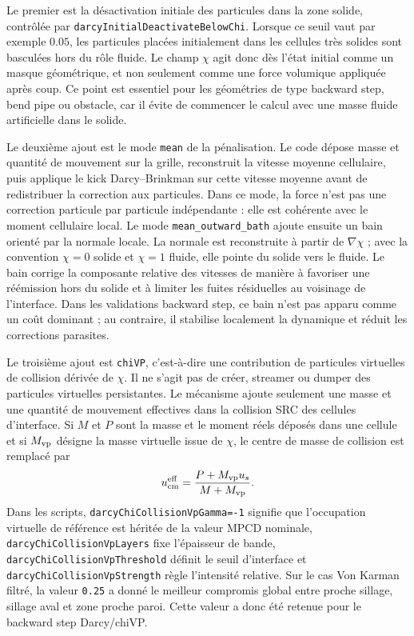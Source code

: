 \documentclass[11pt,a4paper]{article}
\begin{document}
Le premier est la désactivation initiale des particules dans la zone solide, contrôlée par \texttt{darcyInitialDeactivateBelowChi}. Lorsque ce seuil vaut par exemple $0.05$, les particules placées initialement dans les cellules très solides sont basculées hors du rôle fluide. Le champ $\chi$ agit donc dès l'état initial comme un masque géométrique, et non seulement comme une force volumique appliquée après coup. Ce point est essentiel pour les géométries de type backward step, bend pipe ou obstacle, car il évite de commencer le calcul avec une masse fluide artificielle dans le solide.

Le deuxième ajout est le mode \texttt{mean} de la pénalisation. Le code dépose masse et quantité de mouvement sur la grille, reconstruit la vitesse moyenne cellulaire, puis applique le kick Darcy--Brinkman sur cette vitesse moyenne avant de redistribuer la correction aux particules. Dans ce mode, la force n'est pas une correction particule par particule indépendante : elle est cohérente avec le moment cellulaire local. Le mode \texttt{mean\_outward\_bath} ajoute ensuite un bain orienté par la normale locale. La normale est reconstruite à partir de $\nabla\chi$ ; avec la convention $\chi=0$ solide et $\chi=1$ fluide, elle pointe du solide vers le fluide. Le bain corrige la composante relative des vitesses de manière à favoriser une réémission hors du solide et à limiter les fuites résiduelles au voisinage de l'interface. Dans les validations backward step, ce bain n'est pas apparu comme un coût dominant ; au contraire, il stabilise localement la dynamique et réduit les corrections parasites.

Le troisième ajout est \texttt{chiVP}, c'est-à-dire une contribution de particules virtuelles de collision dérivée de $\chi$. Il ne s'agit pas de créer, streamer ou dumper des particules virtuelles persistantes. Le mécanisme ajoute seulement une masse et une quantité de mouvement effectives dans la collision SRC des cellules d'interface. Si $M$ et $P$ sont la masse et le moment réels déposés dans une cellule et si $M_{\rm vp}$ désigne la masse virtuelle issue de $\chi$, le centre de masse de collision est remplacé par
\begin{equation}
  u_{\rm cm}^{\rm eff} = \frac{P + M_{\rm vp} u_s}{M+M_{\rm vp}}.
\end{equation}
Dans les scripts, \texttt{darcyChiCollisionVpGamma=-1} signifie que l'occupation virtuelle de référence est héritée de la valeur MPCD nominale, \texttt{darcyChiCollisionVpLayers} fixe l'épaisseur de bande, \texttt{darcyChiCollisionVpThreshold} définit le seuil d'interface et \texttt{darcyChiCollisionVpStrength} règle l'intensité relative. Sur le cas Von Karman filtré, la valeur \texttt{0.25} a donné le meilleur compromis global entre proche sillage, sillage aval et zone proche paroi. Cette valeur a donc été retenue pour le backward step Darcy/chiVP.
\end{document}
